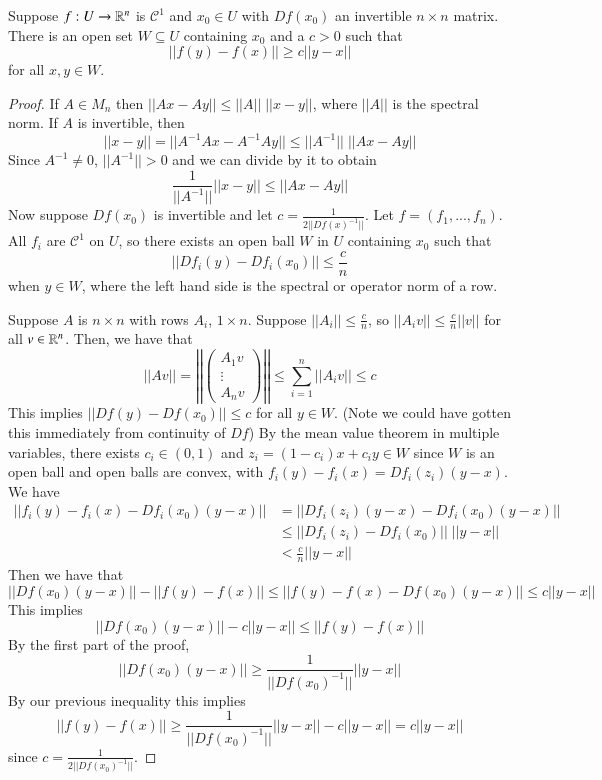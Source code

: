 \begin{lemma}
    Suppose $f:U\rightarrow \mathbb R^n$ is $\mathcal{C}^1$ and $x_0 \in U$ with $Df(x_0)$ an invertible $n\times n$ matrix. There is an open set $W \subseteq U$ containing $x_0$ and a $c > 0$ such that $$||f(y) - f(x)||\geq c||y-x||$$ for all $x,y \in W$.
\end{lemma}
\begin{proof}
    If $A \in M_n$ then $||Ax-Ay|| \leq ||A||\;||x-y||$, where $||A||$ is the spectral norm. If $A$ is invertible, then $$||x-y|| = ||A^{-1}Ax - A^{-1}Ay|| \leq ||A^{-1}||\;||Ax-Ay||$$ Since $A^{-1} \neq 0$, $||A^{-1}|| > 0$ and we can divide by it to obtain $$\frac{1}{||A^{-1}||}||x-y|| \leq ||Ax-Ay||$$ Now suppose $Df(x_0)$ is invertible and let $c = \frac{1}{2||Df(x)^{-1}||}$. Let $f = (f_1,...,f_n)$. All $f_i$ are $\mathcal{C}^1$ on $U$, so there exists an open ball $W$ in $U$ containing $x_0$ such that $$||Df_i(y) - Df_i(x_0)|| \leq \frac{c}{n}$$ when $y \in W$, where the left hand side is the spectral or operator norm of a row. 

    Suppose $A$ is $n\times n$ with rows $A_i$, $1\times n$. Suppose $||A_i|| \leq \frac{c}{n}$, so $||A_iv|| \leq \frac{c}{n}||v||$ for all $v \in \mathbb R^n$. Then, we have that \begin{equation*}
        ||Av|| = \left|\left|\begin{pmatrix} A_1v \\ \vdots \\ A_nv\end{pmatrix}\right|\right| \leq \sum_{i=1}^n||A_iv|| \leq c
    \end{equation*}
    This implies $||Df(y) - Df(x_0)|| \leq c$ for all $y \in W$. (Note we could have gotten this immediately from continuity of $Df$) By the mean value theorem in multiple variables, there exists $c_i \in (0,1)$ and $z_i = (1-c_i)x+c_iy \in W$ since $W$ is an open ball and open balls are convex, with $f_i(y)-f_i(x) = Df_i(z_i)(y-x)$. We have \begin{align*}
        ||f_i(y) - f_i(x) - Df_i(x_0)(y-x)|| &= ||Df_i(z_i)(y-x) - Df_i(x_0)(y-x)|| \\
        &\leq ||Df_i(z_i)-Df_i(x_0)||\;||y-x|| \\
        &< \frac{c}{n}||y-x||
    \end{align*}
    Then we have that $$||Df(x_0)(y-x)|| - ||f(y)-f(x)|| \leq ||f(y) - f(x)-Df(x_0)(y-x)|| \leq c||y-x||$$ This implies $$||Df(x_0)(y-x)||-c||y-x|| \leq ||f(y)-f(x)||$$ By the first part of the proof, $$||Df(x_0)(y-x)|| \geq \frac{1}{||Df(x_0)^{-1}||}||y-x||$$ By our previous inequality this implies $$||f(y) - f(x)|| \geq \frac{1}{||Df(x_0)^{-1}||}||y-x|| - c||y-x|| = c||y-x||$$ since $c = \frac{1}{2||Df(x_0)^{-1}||}$.
\end{proof}

